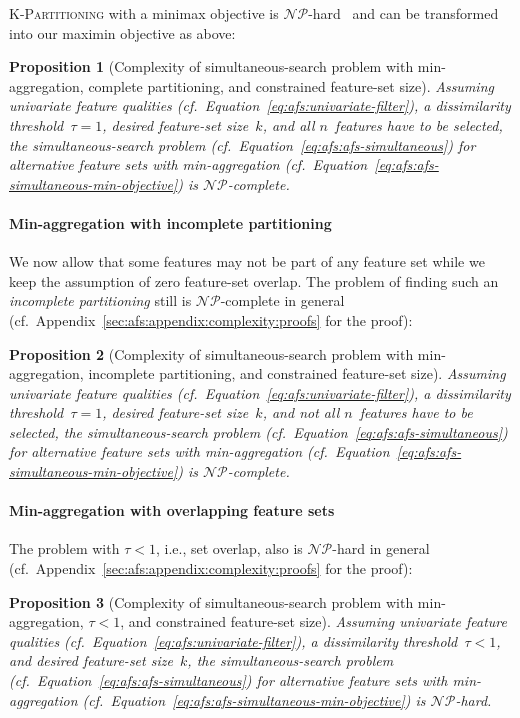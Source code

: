 \documentclass{article}
\newtheorem{proposition}{Proposition}
\theoremstyle{definition}
\begin{document}
\textsc{K-Partitioning} with a minimax objective is $\mathcal{NP}$-hard~\cite{babel1998thek} and
can be transformed into our maximin objective as above:
%
\begin{proposition}[Complexity of simultaneous-search problem with min-aggregation, complete partitioning, and constrained feature-set size]
	Assuming univariate feature qualities (cf.~Equation~\ref{eq:afs:univariate-filter}), a dissimilarity threshold~$\tau = 1$, desired feature-set size~$k$, and all $n$~features have to be selected, the simultaneous-search problem (cf.~Equation~\ref{eq:afs:afs-simultaneous}) for alternative feature sets with min-aggregation (cf.~Equation~\ref{eq:afs:afs-simultaneous-min-objective}) is $\mathcal{NP}$-complete.
	\label{prop:afs:complexity-partitioning-min-constrained-k}
\end{proposition}

\paragraph{Min-aggregation with incomplete partitioning}

We now allow that some features may not be part of any feature set while we keep the assumption of zero feature-set overlap.
The problem of finding such an \emph{incomplete partitioning} still is $\mathcal{NP}$-complete in general (cf.~Appendix~\ref{sec:afs:appendix:complexity:proofs} for the proof):
%
\begin{proposition}[Complexity of simultaneous-search problem with min-aggregation, incomplete partitioning, and constrained feature-set size]
	Assuming univariate feature qualities (cf.~Equation~\ref{eq:afs:univariate-filter}), a dissimilarity threshold~$\tau = 1$, desired feature-set size~$k$, and \emph{not} all $n$~features have to be selected, the simultaneous-search problem (cf.~Equation~\ref{eq:afs:afs-simultaneous}) for alternative feature sets with min-aggregation (cf.~Equation~\ref{eq:afs:afs-simultaneous-min-objective}) is $\mathcal{NP}$-complete.
	\label{prop:afs:complexity-incomplete-partitioning-min-constrained-k}
\end{proposition}

\paragraph{Min-aggregation with overlapping feature sets}

The problem with $\tau < 1$, i.e., set overlap, also is $\mathcal{NP}$-hard in general (cf.~Appendix~\ref{sec:afs:appendix:complexity:proofs} for the proof):
%
\begin{proposition}[Complexity of simultaneous-search problem with min-aggregation, $\tau < 1$, and constrained feature-set size]
	Assuming univariate feature qualities (cf.~Equation~\ref{eq:afs:univariate-filter}), a dissimilarity threshold~$\tau < 1$, and desired feature-set size~$k$, the simultaneous-search problem (cf.~Equation~\ref{eq:afs:afs-simultaneous}) for alternative feature sets with min-aggregation (cf.~Equation~\ref{eq:afs:afs-simultaneous-min-objective}) is $\mathcal{NP}$-hard.
	\label{prop:afs:complexity-no-partitioning-min-constrained-k}
\end{proposition}
\end{document}
